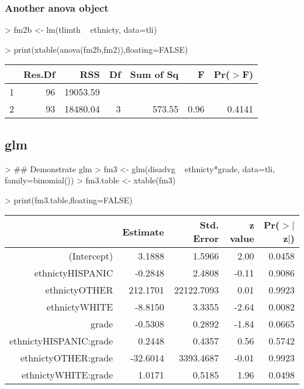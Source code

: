\documentclass[letterpaper]{article}
\begin{document}
\subsubsection{Another anova object}
\begin{Schunk}
\begin{Sinput}
> fm2b <- lm(tlimth ~ ethnicty, data=tli)
\end{Sinput}
\end{Schunk}
\begin{Schunk}
\begin{Sinput}
> print(xtable(anova(fm2b,fm2)),floating=FALSE)
\end{Sinput}
% latex table generated in R 3.1.1 by xtable 1.7-3 package
% 
\begin{tabular}{lrrrrrr}
  \hline
 & Res.Df & RSS & Df & Sum of Sq & F & Pr($>$F) \\ 
  \hline
1 & 96 & 19053.59 &  &  &  &  \\ 
  2 & 93 & 18480.04 & 3 & 573.55 & 0.96 & 0.4141 \\ 
   \hline
\end{tabular}\end{Schunk}


\subsection{glm}

\begin{Schunk}
\begin{Sinput}
> ## Demonstrate glm
> fm3 <- glm(disadvg ~ ethnicty*grade, data=tli, family=binomial())
> fm3.table <- xtable(fm3)
\end{Sinput}
\end{Schunk}
\begin{Schunk}
\begin{Sinput}
> print(fm3.table,floating=FALSE)
\end{Sinput}
% latex table generated in R 3.1.1 by xtable 1.7-3 package
% 
\begin{tabular}{rrrrr}
  \hline
 & Estimate & Std. Error & z value & Pr($>$$|$z$|$) \\ 
  \hline
(Intercept) & 3.1888 & 1.5966 & 2.00 & 0.0458 \\ 
  ethnictyHISPANIC & -0.2848 & 2.4808 & -0.11 & 0.9086 \\ 
  ethnictyOTHER & 212.1701 & 22122.7093 & 0.01 & 0.9923 \\ 
  ethnictyWHITE & -8.8150 & 3.3355 & -2.64 & 0.0082 \\ 
  grade & -0.5308 & 0.2892 & -1.84 & 0.0665 \\ 
  ethnictyHISPANIC:grade & 0.2448 & 0.4357 & 0.56 & 0.5742 \\ 
  ethnictyOTHER:grade & -32.6014 & 3393.4687 & -0.01 & 0.9923 \\ 
  ethnictyWHITE:grade & 1.0171 & 0.5185 & 1.96 & 0.0498 \\ 
   \hline
\end{tabular}\end{Schunk}
\end{document}
